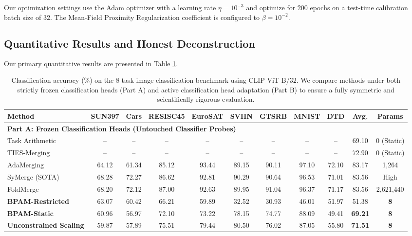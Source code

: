 Our optimization settings use the Adam optimizer with a learning rate $\eta = 10^{-3}$ and optimize for 200 epochs on a test-time calibration batch size of 32. The Mean-Field Proximity Regularization coefficient is configured to $\beta = 10^{-2}$.

\subsection{Quantitative Results and Honest Deconstruction}
Our primary quantitative results are presented in Table \ref{tab:main_results}.

\begin{table}[t]
\caption{Classification accuracy (\%) on the 8-task image classification benchmark using CLIP ViT-B/32. We compare methods under both strictly frozen classification heads (Part A) and active classification head adaptation (Part B) to ensure a fully symmetric and scientifically rigorous evaluation.}
\label{tab:main_results}
\vskip 0.15in
\begin{center}
\begin{small}
\begin{sc}
\setlength{\tabcolsep}{1.2pt}
\begin{tabular}{lcccccccccc}
\toprule
Method & SUN397 & Cars & RESISC45 & EuroSAT & SVHN & GTSRB & MNIST & DTD & Avg. & Params \\
\midrule
\multicolumn{11}{l}{\bf Part A: Frozen Classification Heads (Untouched Classifier Probes)} \\
Task Arithmetic & -- & -- & -- & -- & -- & -- & -- & -- & 69.10 & 0 (Static) \\
TIES-Merging & -- & -- & -- & -- & -- & -- & -- & -- & 72.90 & 0 (Static) \\
AdaMerging & 64.12 & 61.34 & 85.12 & 93.44 & 89.15 & 90.11 & 97.10 & 72.10 & 83.17 & 1,264 \\
SyMerge (SOTA) & 68.28 & 72.27 & 86.62 & 92.81 & 90.29 & 90.64 & 96.53 & 71.01 & 83.56 & High \\
FoldMerge & 68.20 & 72.12 & 87.00 & 92.63 & 89.95 & 91.04 & 96.37 & 71.17 & 83.56 & 2,621,440 \\
{\bf BPAM-Restricted} & 63.07 & 60.42 & 66.21 & 59.89 & 32.52 & 30.93 & 46.01 & 51.97 & 51.38 & {\bf 8} \\
{\bf BPAM-Static} & 60.96 & 56.97 & 72.10 & 73.22 & 78.15 & 74.77 & 88.09 & 49.41 & {\bf 69.21} & {\bf 8} \\
{\bf Unconstrained Scaling} & 59.87 & 57.89 & 75.51 & 79.44 & 80.50 & 76.02 & 87.05 & 55.80 & {\bf 71.51} & {\bf 8} \\

\end{tabular}
\end{sc}
\end{small}
\end{center}
\end{table}

